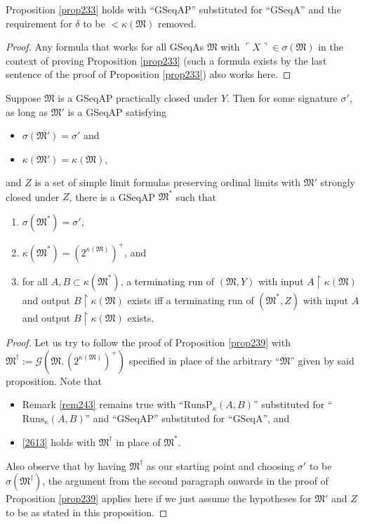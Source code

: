 \documentclass[12pt]{article}
\numberwithin{equation}{section}
\begin{document}
\begin{prop}\label{prop261c}
Proposition \ref{prop233} holds with ``GSeqAP'' substituted for ``GSeqA'' and the requirement for $\delta$ to be $< \kappa(\mathfrak{M})$ removed.
\end{prop}

\begin{proof}
Any formula that works for all GSeqAs $\mathfrak{M}$ with $\ulcorner X \urcorner \in \sigma(\mathfrak{M})$ in the context of proving Proposition \ref{prop233} (such a formula exists by the last sentence of the proof of Proposition \ref{prop233}) also works here.
\end{proof}

\begin{prop}\label{prop261}
Suppose $\mathfrak{M}$ is a GSeqAP practically closed under $Y$. Then for some signature $\sigma'$, as long as $\mathfrak{M}'$ is a GSeqAP satisfying
\begin{itemize}
    \item $\sigma(\mathfrak{M}') = \sigma'$ and
    \item $\kappa(\mathfrak{M}') = \kappa(\mathfrak{M})$,
\end{itemize}
and $Z$ is a set of simple limit formulas preserving ordinal limits with $\mathfrak{M}'$ strongly closed under $Z$, there is a GSeqAP $\mathfrak{M}^*$ such that
\begin{enumerate}[label=(\alph*)]
    \item $\sigma(\mathfrak{M}^*) = \sigma'$,
    \item $\kappa(\mathfrak{M}^*) = (2^{\kappa(\mathfrak{M})})^+$, and
    \item\label{2613} for all $A, B \subset \kappa(\mathfrak{M}^*)$, a terminating run of $(\mathfrak{M}, Y)$ with input $A \restriction \kappa(\mathfrak{M})$ and output $B \restriction \kappa(\mathfrak{M})$ exists iff a terminating run of $(\mathfrak{M}^*, Z)$ with input $A$ and output $B \restriction \kappa(\mathfrak{M})$ exists.
\end{enumerate}
\end{prop}

\begin{proof}
Let us try to follow the proof of Proposition \ref{prop239} with $\mathfrak{M}^{\dagger} := \mathcal{G}(\mathfrak{M}, (2^{\kappa(\mathfrak{M})})^+)$ specified in place of the arbitrary ``$\mathfrak{M}$'' given by said proposition. Note that 
\begin{itemize}
    \item Remark \ref{rem243} remains true with ``$\mathrm{RunsP}_{\kappa}(A, B)$'' substituted for ``$\mathrm{Runs}_{\kappa}(A, B)$'' and ``GSeqAP'' substituted for ``GSeqA'', and 
    \item \ref{2613} holds with $\mathfrak{M}^{\dagger}$ in place of $\mathfrak{M}^*$.
\end{itemize}
Also observe that by having $\mathfrak{M}^{\dagger}$ as our starting point and choosing $\sigma'$ to be $\sigma(\mathfrak{M}^{\dagger})$, the argument from the second paragraph onwards in the proof of Proposition \ref{prop239} applies here if we just assume the hypotheses for $\mathfrak{M}'$ and $Z$ to be as stated in this proposition. 
\end{proof}
\end{document}
